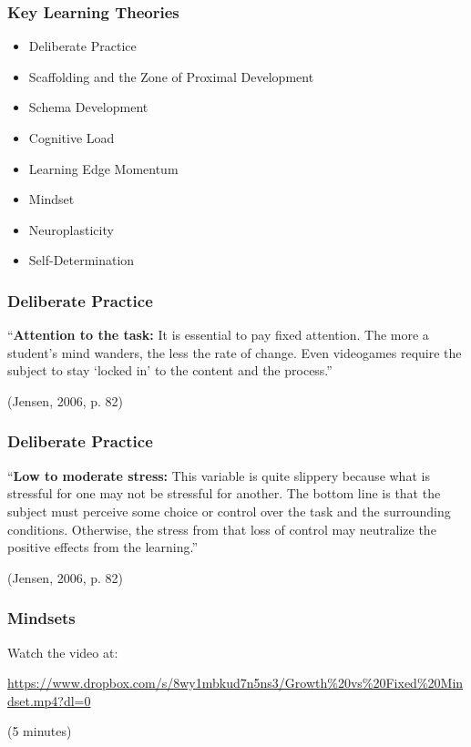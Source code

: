 \begin{frame}
	\frametitle{Key Learning Theories}
	
	\begin{itemize}
		\item Deliberate Practice
		\item Scaffolding and the Zone of Proximal Development
		\item Schema Development
		\item Cognitive Load
		\item Learning Edge Momentum
		\item Mindset
		\item Neuroplasticity
		\item Self-Determination
	\end{itemize}
\end{frame}


\begin{frame}
	\frametitle{Deliberate Practice}
	
	``\textbf{Attention to the task:} It is essential to pay fixed attention. The more a student's
	mind wanders, the less the rate of change. Even videogames require the subject to stay
	`locked in' to the content and the process.''
	
	 (Jensen, 2006, p. 82) 
	
\end{frame}

\begin{frame}
	\frametitle{Deliberate Practice}
	
	``\textbf{Low to moderate stress:} This variable is quite slippery because what is stressful
	for one may not be stressful for another. The bottom line is that the subject must perceive
	some choice or control over the task and the surrounding conditions. Otherwise, the stress 
	from that loss of control may neutralize the positive effects from the learning.''
	
	 (Jensen, 2006, p. 82) 
	
\end{frame}






\begin{frame}
	\frametitle{Mindsets}
	
	Watch the video at:
	
	\vspace{1.5em}
		
	\url{https://www.dropbox.com/s/8wy1mbkud7n5ns3/Growth\%20vs\%20Fixed\%20Mindset.mp4?dl=0}
	
	\vspace{1em}
		
	(5 minutes)
	
\end{frame}

